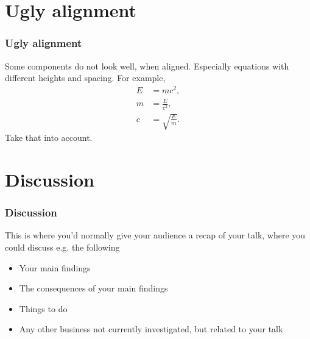 \documentclass{beamer}
\begin{document}
\section{Ugly alignment}
\begin{frame}
\frametitle{Ugly alignment}
Some components do not look well, when aligned. Especially equations with different heights and spacing. For example,
\begin{align}
E &= mc^2, \\
m &= \frac{E}{c^2}, \\
c &= \sqrt{\frac{E}{m}}.
\end{align}
Take that into account.

\end{frame}

\section{Discussion}
\begin{frame}
\frametitle{Discussion}
This is where you’d normally give your audience a recap of your talk, where you could discuss e.g. the following
\begin{itemize}
  \item Your main findings
  \item The consequences of your main findings
  \item Things to do
  \item Any other business not currently investigated, but related to your talk
\end{itemize}
\end{frame}
\end{document}
